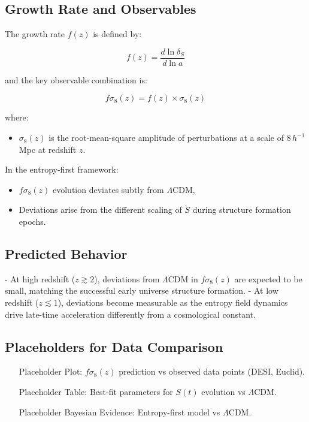 \documentclass{article}
\begin{document}
\subsection{Growth Rate and Observables}

The growth rate $f(z)$ is defined by:

\begin{equation}
f(z) = \frac{d \ln \delta_S}{d \ln a}
\end{equation}

and the key observable combination is:

\begin{equation}
f\sigma_8(z) = f(z) \times \sigma_8(z)
\end{equation}

where:
\begin{itemize}
    \item $\sigma_8(z)$ is the root-mean-square amplitude of perturbations at a scale of $8 \, h^{-1}$ Mpc at redshift $z$.
\end{itemize}

In the entropy-first framework:
\begin{itemize}
    \item $f\sigma_8(z)$ evolution deviates subtly from $\Lambda$CDM,
    \item Deviations arise from the different scaling of $\ddot{S}$ during structure formation epochs.
\end{itemize}

\subsection{Predicted Behavior}

- At high redshift ($z \gtrsim 2$), deviations from $\Lambda$CDM in $f\sigma_8(z)$ are expected to be small, matching the successful early universe structure formation.
- At low redshift ($z \lesssim 1$), deviations become measurable as the entropy field dynamics drive late-time acceleration differently from a cosmological constant.

\subsection{Placeholders for Data Comparison}

\begin{itemize}
    \item [Placeholder] Plot: $f\sigma_8(z)$ prediction vs observed data points (DESI, Euclid).
    \item [Placeholder] Table: Best-fit parameters for $S(t)$ evolution vs $\Lambda$CDM.
    \item [Placeholder] Bayesian Evidence: Entropy-first model vs $\Lambda$CDM.
\end{itemize}
\end{document}
